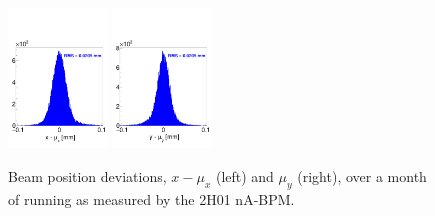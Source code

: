 \begin{figure}[ht]
\begin{center}
\includegraphics[width=0.234\textwidth]{position_2h01x.pdf}
\includegraphics[width=0.234\textwidth]{position_2h01y.pdf}
\caption{Beam position deviations, $x-\mu_x$ (left)  and $\mu_y$ (right), over a month of running as measured by the 2H01 nA-BPM. }
\label{fig:position}
\end{center}
\end{figure}







  




